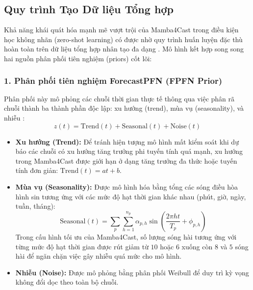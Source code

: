 \subsection{Quy trình Tạo Dữ liệu Tổng hợp}
\label{subsec:synthetic_generation}

Khả năng khái quát hóa mạnh mẽ vượt trội của Mamba4Cast trong điều kiện học không nhãn (zero-shot learning) có được nhờ quy trình huấn luyện đặc thù hoàn toàn trên dữ liệu tổng hợp nhân tạo đa dạng \cite{bhethanabhotla2024}. Mô hình kết hợp song song hai nguồn phân phối tiên nghiệm (priors) cốt lõi:

\subsubsection{1. Phân phối tiên nghiệm ForecastPFN (FPFN Prior)}
Phân phối này mô phỏng các chuỗi thời gian thực tế thông qua việc phân rã chuỗi thành ba thành phần độc lập: xu hướng (trend), mùa vụ (seasonality), và nhiễu \cite{dooley2023}:
\begin{equation}
    z(t) = \text{Trend}(t) + \text{Seasonal}(t) + \text{Noise}(t)
\end{equation}
\begin{itemize}
    \item \textbf{Xu hướng (Trend):} Để tránh hiện tượng mô hình mất kiểm soát khi dự báo các chuỗi có xu hướng tăng trưởng phi tuyến tính quá mạnh, xu hướng trong Mamba4Cast được giới hạn ở dạng tăng trưởng đa thức hoặc tuyến tính đơn giản: $\text{Trend}(t) = a t + b$.
    \item \textbf{Mùa vụ (Seasonality):} Được mô hình hóa bằng tổng các sóng điều hòa hình sin tương ứng với các mức độ hạt thời gian khác nhau (phút, giờ, ngày, tuần, tháng):
    \begin{equation}
        \text{Seasonal}(t) = \sum_{p} \sum_{h=1}^{n_p} \alpha_{p,h} \sin\left( \frac{2\pi h t}{T_p} + \phi_{p,h} \right)
    \end{equation}
    Trong cấu hình tối ưu của Mamba4Cast, số lượng sóng hài tương ứng với từng mức độ hạt thời gian được rút giảm từ $10$ hoặc $6$ xuống còn $8$ và $5$ sóng hài để ngăn chặn việc gây nhiễu quá mức cho mô hình.
    \item \textbf{Nhiễu (Noise):} Được mô phỏng bằng phân phối Weibull để duy trì kỳ vọng không đổi dọc theo toàn bộ chuỗi.
\end{itemize}


